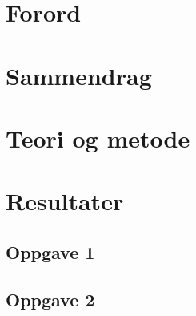\documentclass{article}
\begin{document}

\newpage


\section{Forord} %
\label{sec:forord}

\newpage



\section{Sammendrag} %
\label{sec:sammendrag}

\newpage


\label{sec:innholdsfortegnelse_og_figur_og_tabelliste}
\renewcommand{\contentsname}{Innholdsfortegnelse og figur- og tabelliste}
\tableofcontents
\newpage



\section{Teori og metode} %
\label{sec:teori}

\clearpage

\newpage




\section{Resultater} %
\label{sec:resultater}


\subsection{Oppgave 1} %
\label{sub:oppgave_1}

\newpage


\subsection{Oppgave 2} %
\label{sub:oppgave_2}

\clearpage
\end{document}
